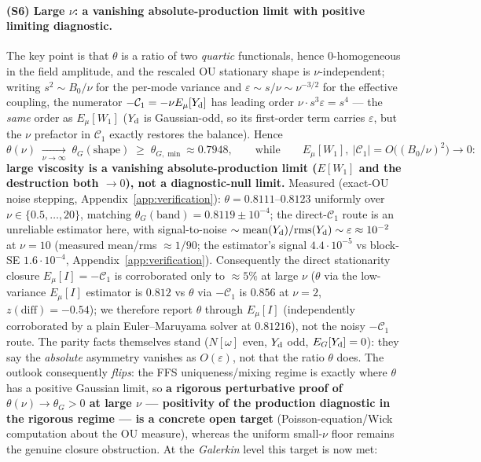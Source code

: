 \documentclass[11pt]{article}
\theoremstyle{remark}
\theoremstyle{plain}
\begin{document}
\paragraph{(S6) Large $\nu$: a vanishing absolute-production limit with positive limiting
diagnostic.} The key point is that $\theta$ is a ratio of two \emph{quartic} functionals, hence $0$-homogeneous in
the field amplitude, and the rescaled OU stationary shape is $\nu$-independent; writing
$s^2 \sim B_0/\nu$ for the per-mode variance and $\varepsilon \sim s/\nu \sim \nu^{-3/2}$
for the effective coupling, the numerator $-\mathcal{C}_1 = -\nu E_\mu[Y_{\rm d}]$ has leading
order $\nu\cdot s^3\varepsilon = s^4$ --- the \emph{same} order as $E_\mu[W_1]$ ($Y_{\rm d}$ is
Gaussian-odd, so its first-order term carries $\varepsilon$, but the $\nu$ prefactor in
$\mathcal{C}_1$ exactly restores the balance). Hence
\begin{equation}
   \theta(\nu) \;\xrightarrow[\nu\to\infty]{}\; \theta_G(\text{shape}) \;\ge\; \theta_{G,\min} \approx 0.7948,
   \qquad\text{while}\qquad E_\mu[W_1],\ |\mathcal{C}_1| = O\!\bigl((B_0/\nu)^2\bigr) \to 0:
\end{equation}
\textbf{large viscosity is a vanishing absolute-production limit ($E[W_1]$ and the destruction both $\to 0$), not a diagnostic-null limit.}
Measured (exact-OU noise stepping, Appendix~\ref{app:verification}):
$\theta = 0.8111$--$0.8123$ uniformly over $\nu \in \{0.5,\dots,20\}$, matching
$\theta_G(\text{band}) = 0.8119 \pm 10^{-4}$; the direct-$\mathcal{C}_1$ route is an unreliable
estimator here, with signal-to-noise
$\sim \mathrm{mean}(Y_{\rm d})/\mathrm{rms}(Y_{\rm d}) \sim \varepsilon \approx 10^{-2}$ at $\nu=10$
(measured mean/rms $\approx 1/90$; the estimator's signal $4.4\cdot10^{-5}$ vs block-SE
$1.6\cdot10^{-4}$, Appendix~\ref{app:verification}). Consequently the
direct stationarity closure $E_\mu[I] = -\mathcal{C}_1$ is corroborated only to $\approx5\%$
at large $\nu$ ($\theta$ via the low-variance $E_\mu[I]$ estimator is $0.812$ vs $\theta$ via
$-\mathcal{C}_1$ is $0.856$ at $\nu=2$, $z(\mathrm{diff})=-0.54$); we therefore report $\theta$
through $E_\mu[I]$ (independently corroborated by a plain Euler--Maruyama solver at $0.81216$),
not the noisy $-\mathcal{C}_1$ route. The parity facts
themselves stand ($N[\omega]$ even, $Y_{\rm d}$ odd, $E_G[Y_{\rm d}]=0$): they say the \emph{absolute}
asymmetry vanishes as $O(\varepsilon)$, not that the ratio $\theta$ does. The outlook
consequently \emph{flips}: the FFS uniqueness/mixing regime is exactly where $\theta$ has
a positive Gaussian limit, so \textbf{a rigorous perturbative proof of
$\theta(\nu) \to \theta_G > 0$ at large $\nu$ --- positivity of the production
diagnostic in the rigorous regime --- is a concrete open target} (Poisson-equation/Wick
computation about the OU measure), whereas the uniform small-$\nu$ floor remains the
genuine closure obstruction. At the \emph{Galerkin} level this target is now met:
\end{document}
